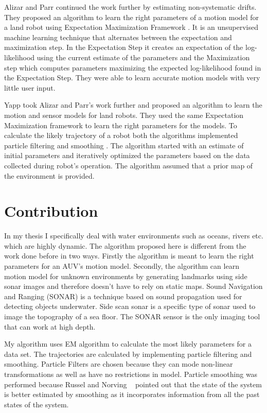 \documentclass[12pt]{dalcsthesis}
\begin{document}
Alizar and Parr \cite{Eliazar2004} continued the work further by estimating non-systematic drifts.  They proposed an algorithm to learn the right parameters of a motion model for a land robot using Expectation Maximization Framework \cite{dempster1977maximum}. It is an unsupervised machine learning technique that alternates between the expectation and maximization step. In the Expectation Step it creates an expectation of the log-likelihood using the current estimate of the parameters and the Maximization step which computes parameters maximizing the expected log-likelihood found in the Expectation Step. They were able to learn accurate motion models with very little user input.

Yapp \cite{Yap2008} took Alizar and Parr's \cite{Eliazar2004} work further and proposed an algorithm to learn the motion and sensor models for land robots. They used the same Expectation Maximization framework to learn the right parameters for the models. To calculate the likely trajectory of a robot both the algorithms implemented particle filtering \cite{ristic2004beyond} \cite{chen2003bayesian} and smoothing \cite{doucet2000monte}.  The algorithm started with an estimate of initial parameters and iteratively optimized the parameters based on the data collected during robot's operation. The algorithm assumed that a prior map of the environment is provided. 

\section{Contribution}

In my thesis I specifically deal with water environments such as oceans, rivers etc. which are highly dynamic.  The algorithm proposed here is different from the work done before in two ways. Firstly the algorithm is meant to learn the right parameters for an AUV's motion model. Secondly, the algorithm can learn motion model for unknown environments by generating landmarks using side sonar images and therefore doesn't have to rely on static maps. Sound Navigation and Ranging (SONAR) is a technique based on sound propagation used for detecting objects underwater. Side scan sonar is a specific type of sonar used to image the topography of a sea floor.  The SONAR sensor is the only imaging tool that can work at high depth. 

My algorithm uses EM algorithm to calculate the most likely parameters for a data set.  The trajectories are calculated by implementing particle filtering and smoothing.  Particle Filters are chosen because they can mode non-linear transformations as well as have no restrictions in model. Particle smoothing was performed because Russel and Norving ~\cite{russell2003artificial} pointed out that the state of the system is better estimated by smoothing as it incorporates information from all the past states of the system. 
\end{document}
